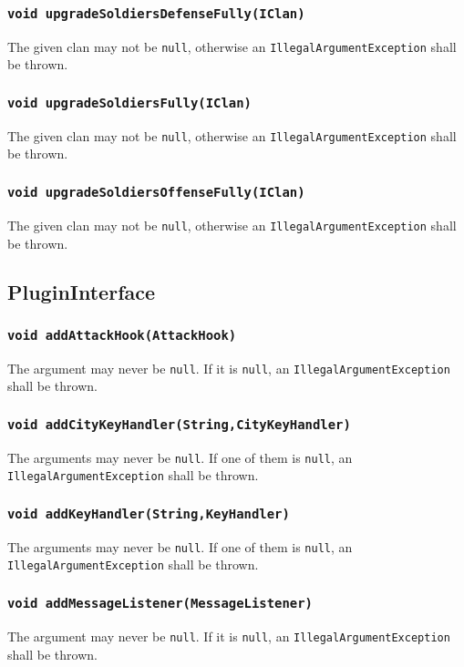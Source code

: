 \documentclass{article}
\begin{document}
\subsubsection{\texttt{void upgradeSoldiersDefenseFully(IClan)}}
The given clan may not be \texttt{null}, otherwise an \texttt{IllegalArgumentException}
shall be thrown.

\subsubsection{\texttt{void upgradeSoldiersFully(IClan)}}
The given clan may not be \texttt{null}, otherwise an \texttt{IllegalArgumentException}
shall be thrown.

\subsubsection{\texttt{void upgradeSoldiersOffenseFully(IClan)}}
The given clan may not be \texttt{null}, otherwise an \texttt{IllegalArgumentException}
shall be thrown.

\subsection{PluginInterface}

\subsubsection{\texttt{void addAttackHook(AttackHook)}}
The argument may never be \texttt{null}. If it is \texttt{null}, an \texttt{IllegalArgumentException}
shall be thrown.

\subsubsection{\texttt{void addCityKeyHandler(String,CityKeyHandler)}}
The arguments may never be \texttt{null}. If one of them is \texttt{null}, an \texttt{IllegalArgumentException}
shall be thrown.

\subsubsection{\texttt{void addKeyHandler(String,KeyHandler)}}
The arguments may never be \texttt{null}. If one of them is \texttt{null}, an \texttt{IllegalArgumentException}
shall be thrown.

\subsubsection{\texttt{void addMessageListener(MessageListener)}}
The argument may never be \texttt{null}. If it is \texttt{null}, an \texttt{IllegalArgumentException}
shall be thrown.
\end{document}
